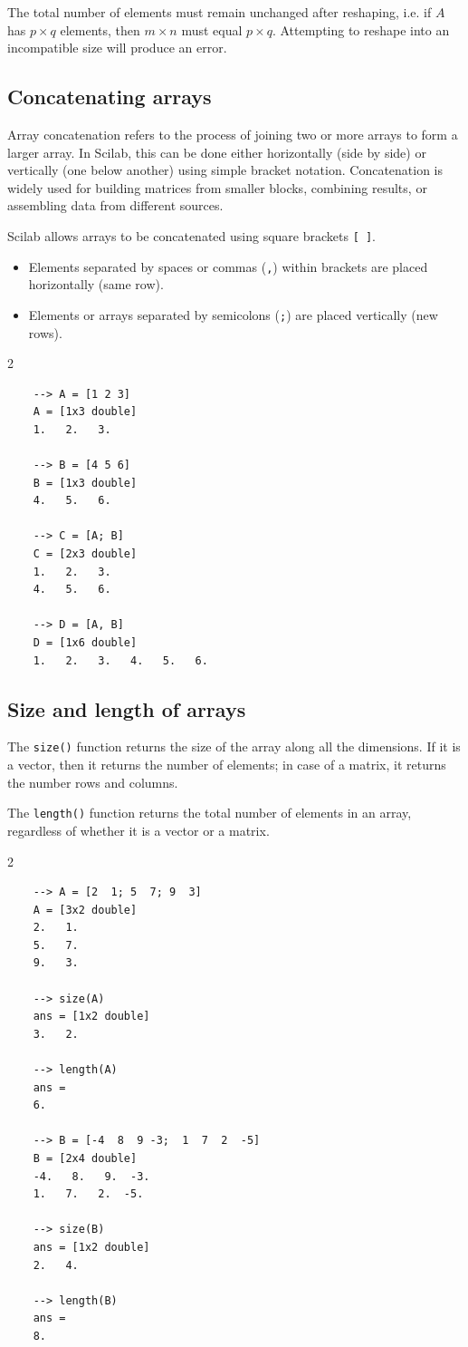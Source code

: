 The total number of elements must remain unchanged after reshaping, i.e. if $A$ has $p\times q$ elements, then $m\times n$ must equal $p\times q$. Attempting to reshape into an incompatible size will produce an error.

\subsection{Concatenating arrays}
Array concatenation refers to the process of joining two or more arrays to form a larger array. In Scilab, this can be done either horizontally (side by side) or vertically (one below another) using simple bracket notation. Concatenation is widely used for building matrices from smaller blocks, combining results, or assembling data from different sources.

Scilab allows arrays to be concatenated using square brackets \verb|[ ]|.
\begin{itemize}
	\item Elements separated by spaces or commas (\verb|,|) within brackets are placed horizontally (same row).
	\item Elements or arrays separated by semicolons (\verb|;|) are placed vertically (new rows).
\end{itemize}
\begin{multicols}{2}
	\begin{verbatim}
	--> A = [1 2 3]
	A = [1x3 double]
	1.   2.   3.
		
	--> B = [4 5 6]
	B = [1x3 double]
	4.   5.   6.
		
	--> C = [A; B]
	C = [2x3 double]
	1.   2.   3.
	4.   5.   6.
		
	--> D = [A, B]
	D = [1x6 double]
	1.   2.   3.   4.   5.   6.
	\end{verbatim}
\end{multicols}

\subsection{Size and length of arrays}
The \verb|size()| function returns the size of the array along all the dimensions. If it is a vector, then it returns the number of elements; in case of a matrix, it returns the number rows and columns.

The \verb|length()| function returns the total number of elements in an array, regardless of whether it is a vector or a matrix.
\begin{multicols}{2}
	\begin{verbatim}
	--> A = [2  1; 5  7; 9  3]
	A = [3x2 double]
	2.   1.
	5.   7.
	9.   3.
		
	--> size(A)
	ans = [1x2 double]
	3.   2.
		
	--> length(A)
	ans = 
	6.
		
	--> B = [-4  8  9 -3;  1  7  2  -5]
	B = [2x4 double]
	-4.   8.   9.  -3.
	1.   7.   2.  -5.
		
	--> size(B)
	ans = [1x2 double]
	2.   4.
		
	--> length(B)
	ans = 
	8.
	\end{verbatim}
\end{multicols}